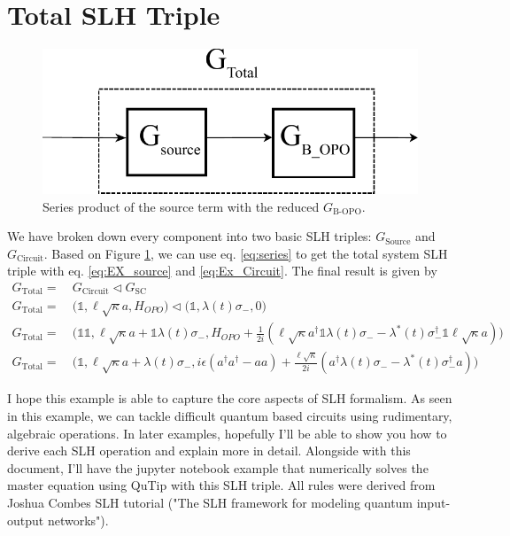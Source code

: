 \documentclass[a4paper]{article}
\theoremstyle{definition}
\begin{document}
\section*{Total SLH Triple}

\begin{figure}[H]
\centering
\includegraphics[width = 9 cm]{Example_Sourced_feedback_final.pdf}
\caption{Series product of the source term with the reduced $G_{\text{B-OPO}}$.
}
\label{fig:Final_connection}
\end{figure}  

We have broken down every component into two basic SLH triples: $G_{\text{Source}}$ and $G_{\text{Circuit}}$. Based on Figure \ref{fig:Final_connection}, we can use eq. \ref{eq:series} to get the total system SLH triple with eq. \ref{eq:EX_source} and \ref{eq:Ex_Circuit}. The final result is given by 
\begin{align*}
    G_{\text{Total}} = & \ G_{\text{Circuit}} \triangleleft G_{\text{SC}} \\
    G_{\text{Total}} = & \ \Bigg( \mathbb{1}, \ell \sqrt{\kappa}a ,H_{OPO}\Bigg) \triangleleft \Bigg( \mathbb{1}, \lambda(t)\sigma_-, 0 \Bigg) \\ 
    G_{\text{Total}} = & \ \Bigg( \mathbb{1}\mathbb{1}, \ell \sqrt{\kappa}a +  \mathbb{1} \lambda(t)\sigma_-,H_{OPO} + \frac{1}{2i}(\ell \sqrt{\kappa}a^\dagger \mathbb{1}  \lambda(t)\sigma_- - \lambda^*(t)\sigma_-^\dagger \mathbb{1}  \ell \sqrt{\kappa}a) \Bigg)
\end{align*}
\begin{align}
    G_{\text{Total}} = & \ \Bigg( \mathbb{1}, \ell \sqrt{\kappa}a + \lambda(t)\sigma_-, i\epsilon(a^\dagger a^\dagger - a a) + \frac{\ell \sqrt{\kappa}}{2i}(a^\dagger \lambda(t)\sigma_- - \lambda^*(t)\sigma_-^\dagger a) \Bigg)
    \label{eq:EX_FINAL_RESULT}
\end{align}

I hope this example is able to capture the core aspects of SLH formalism. As seen in this example, we can tackle difficult quantum based circuits using rudimentary, algebraic operations. In later examples, hopefully I'll be able to show you how to derive each SLH operation and explain more in detail. Alongside with this document, I'll have the jupyter notebook example that numerically solves the master equation using QuTip with this SLH triple. All rules were derived from Joshua Combes SLH tutorial ("The SLH framework for modeling quantum input-output networks"). 





\end{document}
